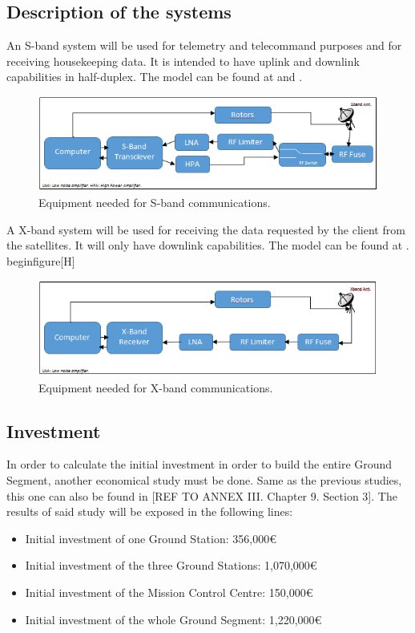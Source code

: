 \subsection{Description of the systems}
An S-band system will be used for telemetry and telecommand purposes and for receiving housekeeping data. It is intended to have uplink and downlink capabilities in half-duplex. The model can be found at \cite{SBand} and \cite{SBandDatasheet}.
\begin{figure}[H]
\begin{center}
\includegraphics[scale=1]{SbandEquip.PNG}
\caption[S-band Equipment]{Equipment needed for S-band communications.}
\label{fig:SbandEquip}
\end{center}
\end{figure}

A X-band system will be used for receiving the data requested by the client from the satellites. It will only have downlink capabilities. The model can be found at \cite{XBand}.
begin{figure}[H]
\begin{figure}[H]
\begin{center}
\includegraphics[scale=1]{XbandEquip.PNG}
\caption[X-band Equipment]{Equipment needed for X-band communications.}
\label{fig:XbandEquip}
\end{center}
\end{figure}

\subsection{Investment}
In order to calculate the initial investment in order to build the entire Ground Segment, another economical study must be done. Same as the previous studies, this one can also be found in [{REF TO ANNEX III. Chapter 9. Section 3}]. The results of said study will be exposed in the following lines:

\begin{itemize}
\item Initial investment of one Ground Station: 356,000\euro
\item Initial investment of the three Ground Stations: 1,070,000\euro
\item Initial investment of the Mission Control Centre: 150,000\euro
\item Initial investment of the whole Ground Segment: 1,220,000\euro
\end{itemize}